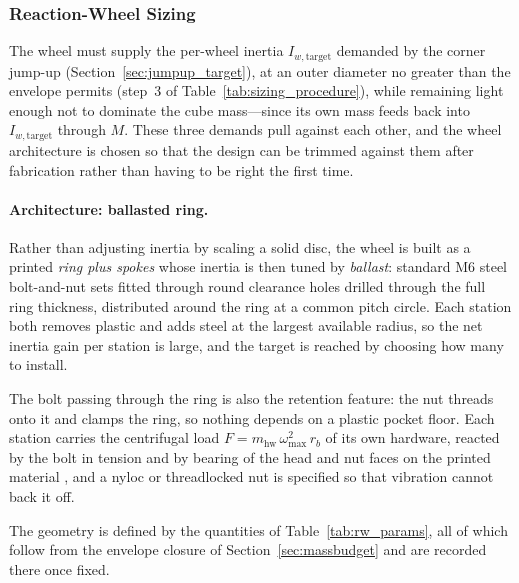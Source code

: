 \subsubsection{Reaction-Wheel Sizing}
\label{sec:rw_sizing}

The wheel must supply the per-wheel inertia $I_{w,\text{target}}$ demanded by
the corner jump-up (Section~\ref{sec:jumpup_target}), at an outer diameter no
greater than the envelope permits (step~3 of
Table~\ref{tab:sizing_procedure}), while remaining light enough not to dominate
the cube mass---since its own mass feeds back into $I_{w,\text{target}}$
through $M$. These three demands pull against each other, and the wheel
architecture is chosen so that the design can be trimmed against them after
fabrication rather than having to be right the first time.

\paragraph{Architecture: ballasted ring.} Rather than adjusting inertia by
scaling a solid disc, the wheel is built as a printed \emph{ring plus spokes}
whose inertia is then tuned by \emph{ballast}: standard M6 steel bolt-and-nut
sets fitted through round clearance holes drilled through the full ring
thickness, distributed around the ring at a common pitch circle. Each station
both removes plastic and adds steel at the largest available radius, so the net inertia gain per station is large, and the target is reached by choosing how many to install. 

The bolt passing through the ring is also the retention feature: the nut
threads onto it and clamps the ring, so nothing depends on a plastic pocket
floor. Each station carries the centrifugal load
$F = m_{\text{hw}}\,\omega_{\max}^2\,r_b$ of its own hardware, reacted by the
bolt in tension and by bearing of the head and nut faces on the printed
material
, and a nyloc
or threadlocked nut is specified so that vibration cannot back it off.

The geometry is defined by the quantities of Table~\ref{tab:rw_params}, all of
which follow from the envelope closure of Section~\ref{sec:massbudget} and are
recorded there once fixed.

